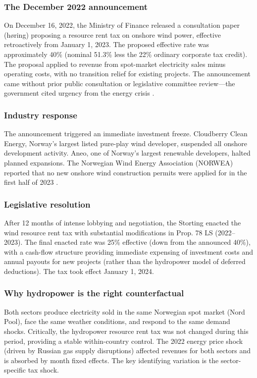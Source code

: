 \documentclass[12pt]{article}
\begin{document}
\subsubsection*{The December 2022 announcement} On December 16, 2022, the Ministry of Finance released a consultation paper (h\o ring) proposing a resource rent tax on onshore wind power, effective retroactively from January 1, 2023. The proposed effective rate was approximately 40\% (nominal 51.3\% less the 22\% ordinary corporate tax credit). The proposal applied to revenue from spot-market electricity sales minus operating costs, with no transition relief for existing projects. The announcement came without prior public consultation or legislative committee review---the government cited urgency from the energy crisis \citep{nve2023wind}.

\subsubsection*{Industry response} The announcement triggered an immediate investment freeze. Cloudberry Clean Energy, Norway's largest listed pure-play wind developer, suspended all onshore development activity. Aneo, one of Norway's largest renewable developers, halted planned expansions. The Norwegian Wind Energy Association (NORWEA) reported that no new onshore wind construction permits were applied for in the first half of 2023 \citep{norwea2023report}.

\subsubsection*{Legislative resolution} After 12 months of intense lobbying and negotiation, the Storting enacted the wind resource rent tax with substantial modifications in Prop. 78 LS (2022--2023). The final enacted rate was 25\% effective (down from the announced 40\%), with a cash-flow structure providing immediate expensing of investment costs and annual payouts for new projects (rather than the hydropower model of deferred deductions). The tax took effect January 1, 2024.

\subsubsection*{Why hydropower is the right counterfactual} Both sectors produce electricity sold in the same Norwegian spot market (Nord Pool), face the same weather conditions, and respond to the same demand shocks. Critically, the hydropower resource rent tax was not changed during this period, providing a stable within-country control. The 2022 energy price shock (driven by Russian gas supply disruptions) affected revenues for both sectors and is absorbed by month fixed effects. The key identifying variation is the sector-specific tax shock.
\end{document}
